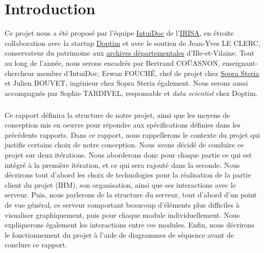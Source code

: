 \chapter{Introduction}
\pagestyle{fancy}
\fancyhf{}

Ce projet nous a été proposé par l’équipe \href{https://www-intuidoc.irisa.fr/}{IntuiDoc} de l’\href{https://www.irisa.fr/}{IRISA}, en étroite collaboration avec la startup \href{http://www.doptim.eu}{Doptim} et avec le soutien de Jean-Yves LE CLERC, conservateur du patrimoine aux \href{http://archives.ille-et-vilaine.fr/fr}{archives départementales} d'Ille-et-Vilaine. Tout au long de l’année, nous serons encadrés par Bertrand COÜASNON, enseignant-chercheur membre d'IntuiDoc, Erwan FOUCHÉ, chef de projet chez \href{https://www.soprasteria.com/fr}{Sopra Steria} et Julien BOUVET, ingénieur chez Sopra Steria également. Nous serons aussi accompagnés par Sophie TARDIVEL, responsable et \textit{data scientist} chez Doptim.

\paragraph{}
Ce rapport définira la structure de notre projet, ainsi que les moyens de conception mis en oeuvre pour répondre aux spécifications définies dans les précédents rapports. Dans ce rapport, nous rappellerons le contexte du projet qui justifie certains choix de notre conception. Nous avons décidé de conduire ce projet sur deux itérations. Nous aborderons donc pour chaque partie ce qui est intégré à la première itération, et ce qui sera rajouté dans la seconde. Nous décrirons tout d'abord les choix de technologies pour la réalisation de la partie client du projet (IHM), son organisation, ainsi que ses interactions avec le serveur. Puis, nous parlerons de la structure du serveur, tout d'abord d'un point de vue général, ce serveur comportant beaucoup d'éléments plus difficiles à visualiser graphiquement, puis pour chaque module individuellement. Nous expliquerons également les interactions entre ces modules. Enfin, nous décrirons le fonctionnement du projet à l'aide de diagrammes de séquence avant de conclure ce rapport.